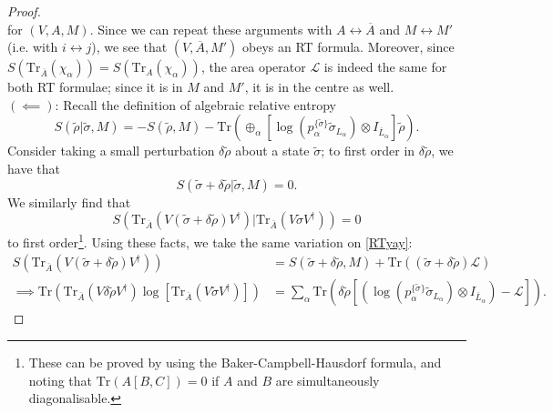 \documentclass[12pt,a4paper]{report}
\numberwithin{equation}{section}
\newcommand{\ol}[1]{\overline{#1}}
\newcommand{\tr}{\text{Tr}}
\theoremstyle{definition}
\theoremstyle{theorem}
\theoremstyle{theorem}
\theoremstyle{example}
\theoremstyle{definition}
\begin{document}
\begin{proof}
\begin{equation}
	\end{equation}
	for $(V,A,M)$. Since we can repeat these arguments with $A\leftrightarrow\ol{A}$ and $M\leftrightarrow M'$ (i.e. with $i\leftrightarrow j$), we see that $(V,\ol{A},M')$ obeys an RT formula. Moreover, since $S\left(\tr_{\ol{A}}\left(\chi_{\alpha}\right)\right)=S\left(\tr_{A}\left(\chi_{\alpha}\right)\right)$, the area operator $\mathcal{L}$ is indeed the same for both RT formulae; since it is in $M$ and $M'$, it is in the centre as well.\\
	$(\impliedby)$: Recall the definition of algebraic relative entropy
	\begin{equation}
		S(\tilde{\rho}|\tilde{\sigma},M)=-S(\tilde{\rho},M)-\tr\left(\oplus_{\alpha}\left[\log\left(p_{\alpha}^{\{\tilde{\sigma}\}}\tilde{\sigma}_{L_{\alpha}}\right)\otimes I_{\ol{L}_{\alpha}}\right]\tilde{\rho}\right).
	\end{equation}
	Consider taking a small perturbation $\delta\tilde{\rho}$ about a state $\tilde{\sigma}$; to first order in $\delta\tilde{\rho}$, we have that
	\begin{equation}
		S(\tilde{\sigma}+\delta\tilde{\rho}|\tilde{\sigma},M)=0.
	\end{equation}
	We similarly find that
	\begin{equation}
		S\left(\tr_{\ol{A}}\left(V\left(\tilde{\sigma}+\delta\tilde{\rho}\right)V^{\dagger}\right)|\tr_{\ol{A}}\left(V\tilde{\sigma}V^{\dagger}\right)\right)=0
	\end{equation}
	to first order\footnote{These can be proved by using the Baker-Campbell-Hausdorf formula, and noting that $\tr(A[B,C])=0$ if $A$ and $B$ are simultaneously diagonalisable.}. Using these facts, we take the same variation on \ref{RTyay}:
	\begin{equation}
		\begin{aligned}
			S\left(\tr_{\ol{A}}\left(V\left(\tilde{\sigma}+\delta\tilde{\rho}\right)V^{\dagger}\right)\right)&=S(\tilde{\sigma}+\delta\tilde{\rho},M)+\tr\left(\left(\tilde{\sigma}+\delta\tilde{\rho}\right)\mathcal{L}\right)\\
			\implies \tr\left(\tr_{\ol{A}}\left(V\delta\tilde{\rho} V^{\dagger}\right)\log\left[\tr_{\ol{A}}\left(V\tilde{\sigma} V^{\dagger}\right)\right]\right)&=\sum_{\alpha}\tr\left(\delta\tilde{\rho}\left[\left(\log\left(p_{\alpha}^{\{\tilde{\sigma}\}}\tilde{\sigma}_{L_{\alpha}}\right)\otimes I_{\ol{L}_{\alpha}}\right)-\mathcal{L}\right]\right).
		\end{aligned}
	\end{equation}

\end{proof}
\end{document}
